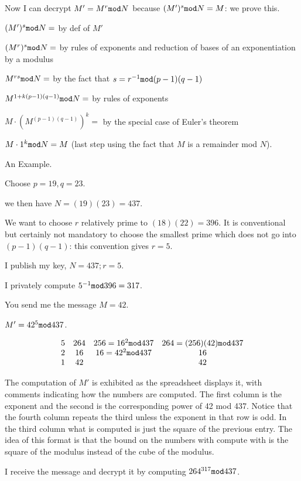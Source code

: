 \documentclass[12pt]{article}
\begin{document}
Now I can decrypt $M' = M^r {\tt mod} N$ because $(M')^s {\tt mod} N = M$:  we prove this.

$(M')^s {\tt mod} N =$  by def of $M'$

$(M^r)^s {\tt mod} N =$ by rules of exponents and reduction of bases of an exponentiation by a modulus

$M^{rs} {\tt mod} N =$ by the fact that $s=r^{-1}{\tt mod}(p-1)(q-1)$

$M^{1+k(p-1)(q-1)} {\tt mod}N= $  by rules of exponents 

$M \cdot (M^{(p-1)(q-1)})^k =$ by the special case of Euler's theorem

$M\cdot 1^k {\tt mod}N = M$ (last step using the fact that $M$ is a remainder mod $N$).

An Example.

Choose $p=19, q=23$.

we then have $N=(19)(23) = 437$.

We want to choose $r$ relatively prime to $(18)(22) = 396$.  It is conventional but certainly not mandatory
to choose the smallest prime which does not go into $(p-1)(q-1)$:  this convention gives $r=5$.

I publish my key, $N=437; r=5$.

I privately compute $5^{-1}{\tt mod}396 = 317$.

You send me the message $M=42$.

$M' = 42^5 {\tt mod} 437$.

$$\begin{array}{cccc}

5 &  264 & 256 = 16^2 {\tt mod}437& 264 = (256)(42){\tt mod}437\\
2 & 16 & 16 = 42^2 {\tt mod}437& 16 \\
1 & 42 &  & 42 \\
\end{array}$$

The computation of $M'$ is exhibited as the spreadsheet displays it, with comments indicating how the numbers are computed.  The first column is the exponent and the second is the corresponding power of 42 mod 437.  Notice that the fourth column repeats the third unless the exponent in that row is odd.  In the third column what is computed is just the square of the previous entry.  The idea of this format is that the bound on the numbers with compute with is the square of the modulus instead of the cube of the modulus.

I receive the message and decrypt it by computing $264^{317}{\tt mod}437$.
\end{document}

